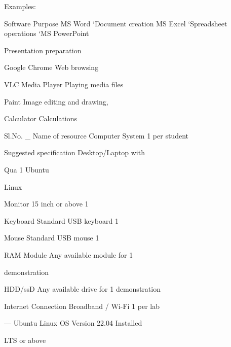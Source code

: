 \documentclass[10pt,a4paper]{article}
\begin{document}
\noindent Examples:\par
\noindent Software Purpose MS Word ‘Document creation MS Excel ‘Spreadsheet operations ‘MS PowerPoint\par
\noindent Presentation preparation\par
\noindent Google Chrome Web browsing\par

\noindent VLC Media Player                                Playing media files\par

\noindent Paint Image editing and drawing,\par
\noindent Calculator Calculations\par
\clearpage
\noindent Sl.No.                      \_ Name of resource         Computer System               1 per student\par
\noindent Suggested specification    Desktop/Laptop with\par
\noindent Qua 1                      Ubuntu\par

\noindent Linux\par

                                                      Monitor 15 inch or above 1\par

                                                      Keyboard Standard USB keyboard 1\par

                                                      Mouse Standard USB mouse 1\par

                                                      RAM Module Any available module for 1\par
\noindent demonstration\par

                                                      HDD/ssD Any available drive for 1 demonstration\par

                                                      Internet Connection Broadband / Wi-Fi 1 per lab\par

—                                     Ubuntu Linux OS Version 22.04     Installed\par
\noindent LTS or above\par
\end{document}

